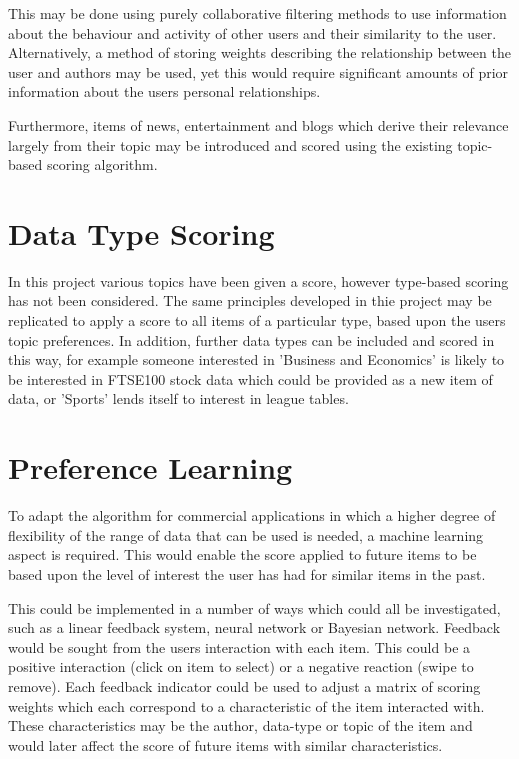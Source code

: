 This may be done using purely collaborative filtering methods to use information about the behaviour and activity of other users and their similarity to the user. Alternatively, a method of storing weights describing the relationship between the user and authors may be used, yet this would require significant amounts of prior information about the users personal relationships. 

Furthermore, items of news, entertainment and blogs which derive their relevance largely from their topic may be introduced and scored using the existing topic-based scoring algorithm. 

\section{Data Type Scoring}

In this project various topics have been given a score, however type-based scoring has not been considered. The same principles developed in thie project may be replicated to apply a score to all items of a particular type, based upon the users topic preferences. In addition, further data types can be included and scored in this way, for example someone interested in 'Business and Economics' is likely to be interested in FTSE100 stock data which could be provided as a new item of data, or 'Sports' lends itself to interest in league tables. 

\section{Preference Learning}

To adapt the algorithm for commercial applications in which a higher degree of flexibility of the range of data that can be used is needed, a machine learning aspect is required. This would enable the score applied to future items to be based upon the level of interest the user has had for similar items in the past. 

This could be implemented in a number of ways which could all be investigated, such as a linear feedback system, neural network or Bayesian network. Feedback would be sought from the users interaction with each item. This could be a positive interaction (click on item to select) or a negative reaction (swipe to remove). Each feedback indicator could be used to adjust a matrix of scoring weights which each correspond to a characteristic of the item interacted with. These characteristics may be the author, data-type or topic of the item and would later affect the score of future items with similar characteristics.  


